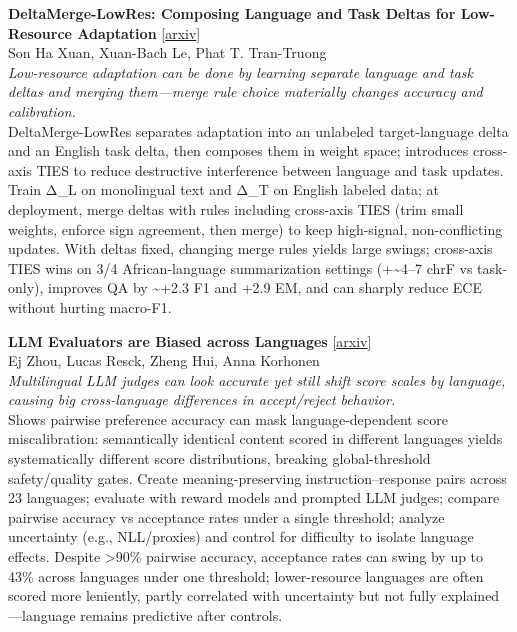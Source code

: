 \documentclass[12pt,letterpaper]{article}
\begin{document}
\medskip

{\small\textbf{DeltaMerge-LowRes: Composing Language and Task Deltas for Low-Resource Adaptation}} {\scriptsize[\href{https://arxiv.org/abs/2607.13967}{arxiv}]}\\
{\scriptsize Son Ha Xuan, Xuan-Bach Le, Phat T. Tran-Truong}\\

{\small\textit{Low-resource adaptation can be done by learning separate language and task deltas and merging them---merge rule choice materially changes accuracy and calibration.}}\\[1pt]
{\footnotesize DeltaMerge-LowRes separates adaptation into an unlabeled target-language delta and an English task delta, then composes them in weight space; introduces cross-axis TIES to reduce destructive interference between language and task updates. Train Δ\_L on monolingual text and Δ\_T on English labeled data; at deployment, merge deltas with rules including cross-axis TIES (trim small weights, enforce sign agreement, then merge) to keep high-signal, non-conflicting updates. With deltas fixed, changing merge rules yields large swings; cross-axis TIES wins on 3/4 African-language summarization settings (+\textasciitilde{}4--7 chrF vs task-only), improves QA by \textasciitilde{}+2.3 F1 and +2.9 EM, and can sharply reduce ECE without hurting macro-F1.}

\medskip

{\small\textbf{LLM Evaluators are Biased across Languages}} {\scriptsize[\href{https://arxiv.org/abs/2607.14480}{arxiv}]}\\
{\scriptsize Ej Zhou, Lucas Resck, Zheng Hui, Anna Korhonen}\\

{\small\textit{Multilingual LLM judges can look accurate yet still shift score scales by language, causing big cross-language differences in accept/reject behavior.}}\\[1pt]
{\footnotesize Shows pairwise preference accuracy can mask language-dependent score miscalibration: semantically identical content scored in different languages yields systematically different score distributions, breaking global-threshold safety/quality gates. Create meaning-preserving instruction--response pairs across 23 languages; evaluate with reward models and prompted LLM judges; compare pairwise accuracy vs acceptance rates under a single threshold; analyze uncertainty (e.g., NLL/proxies) and control for difficulty to isolate language effects. Despite >90\% pairwise accuracy, acceptance rates can swing by up to 43\% across languages under one threshold; lower-resource languages are often scored more leniently, partly correlated with uncertainty but not fully explained---language remains predictive after controls.}
\end{document}
